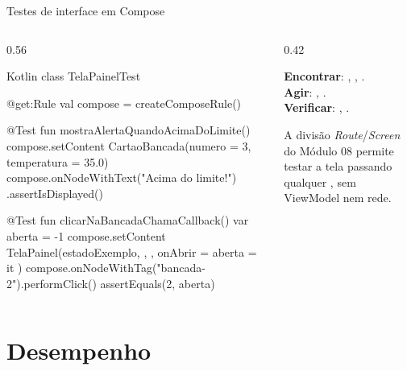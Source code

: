 \documentclass[aspectratio=169,10pt]{beamer}
\begin{document}
\begin{frame}[fragile]{Testes de interface em Compose}
  \begin{columns}[T]
    \begin{column}{0.56\textwidth}
\begin{codigo}[title=TelaPainelTest.kt]{Kotlin}
class TelaPainelTest {
  @get:Rule val compose = createComposeRule()

  @Test fun mostraAlertaQuandoAcimaDoLimite() {
    compose.setContent {
      CartaoBancada(numero = 3, temperatura = 35.0)
    }
    compose.onNodeWithText("Acima do limite!")
      .assertIsDisplayed()
  }

  @Test fun clicarNaBancadaChamaCallback() {
    var aberta = -1
    compose.setContent {
      TelaPainel(estadoExemplo, {}, {}, onAbrir = { aberta = it })
    }
    compose.onNodeWithTag("bancada-2").performClick()
    assertEquals(2, aberta)
  }
}
\end{codigo}
    \end{column}
    \begin{column}{0.42\textwidth}
      \begin{conceito}
        \scriptsize
        \textbf{Encontrar}: , , .\\
        \textbf{Agir}: , .\\
        \textbf{Verificar}: , .
      \end{conceito}
      \begin{conceito}
        A divisão \emph{Route}/\emph{Screen} do Módulo 08 permite testar a tela passando qualquer , sem ViewModel nem rede.
      \end{conceito}
    \end{column}
  \end{columns}
\end{frame}

\section{Desempenho}
\end{document}
